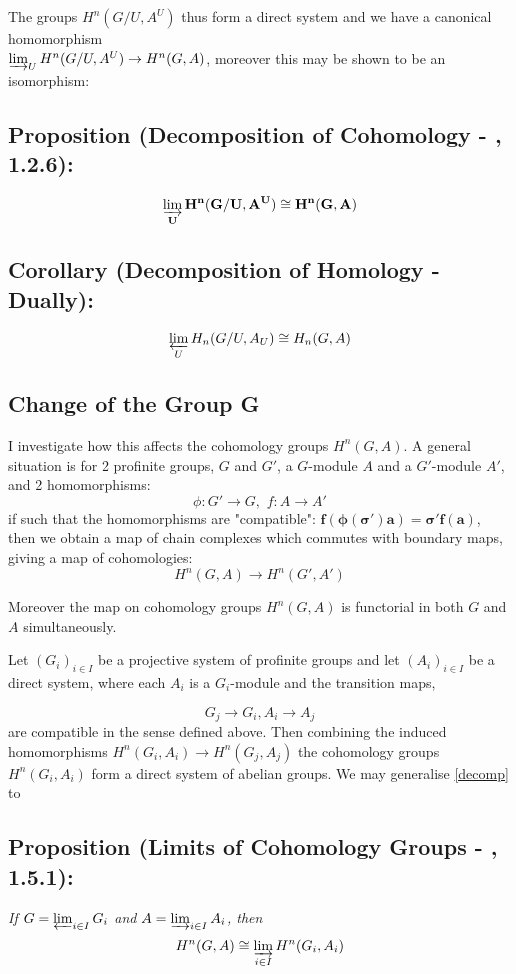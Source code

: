 The groups $H^n(G/U,A^U)$ thus form a direct system and we have a canonical homomorphism \\ $\varinjlim_U H^n(G/U,A^U)\rightarrow H^n(G,A)$, moreover this may be shown to be an isomorphism:

\subsection{Proposition (Decomposition of Cohomology - \cite{N}, 1.2.6):\label{decomp}}
\emph{$$\mathbf{\varinjlim_U H^n(G/U,A^U)\cong H^n(G,A)}$$}

\subsection{Corollary (Decomposition of Homology - Dually):}

\emph{$$\varprojlim_U H_n(G/U,A_U)\cong H_n(G,A)$$}



\subsection{Change of the Group G\label{COGS}}

I investigate how this affects the cohomology groups $H^n(G,A)$. A general situation is for 2 profinite groups, $G$ and $G'$, a $G$-module $A$ and a $G'$-module $A'$, and 2 homomorphisms:
$$\phi:G'\rightarrow G,\,\, f:A\rightarrow A'$$
if such that the homomorphisms are "compatible": $\mathbf{f(\phi(\sigma')a) = \sigma' f (a)}$, then we obtain a map of chain complexes which commutes with boundary maps, giving a map of cohomologies:
$$H^n(G,A)\rightarrow H^n(G',A')$$

Moreover the map on cohomology groups $H^n(G,A)$ is functorial in both $G$ and $A$ simultaneously.

Let $(G_i)_{i\in I}$ be a projective system of profinite groups and let $(A_i)_{i\in I}$ be a direct system, where each $A_i$ is a $G_i$-module and the transition maps,

$$G_j\rightarrow G_i, A_i\rightarrow A_j$$
are compatible in the sense defined above. Then combining the induced homomorphisms $H^n(G_i, A_i)\rightarrow H^n (G_j, A_j)$ the cohomology groups $H^n(G_i, A_i)$ form a direct system of abelian groups. We may generalise \ref{decomp} to

\subsection{Proposition (Limits of Cohomology Groups - \cite{N}, 1.5.1):\label{LCG}}
\emph{If $G = \varprojlim_{i\in I} G_i$ and $A = \varinjlim_{i\in I} A_i$, then
$$H^n(G,A) \cong \varinjlim_{i\in I} H^n(G_i, A_i)$$}


